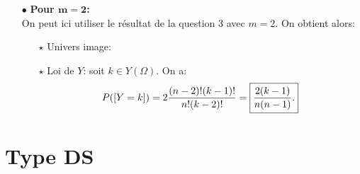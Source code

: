\documentclass[a4paper, 11pt,reqno]{article}
\begin{document}
\begin{correction}
\begin{enumerate}
\begin{itemize}
\begin{itemize}
						      $$P(\lbrack Y=k\rbrack)=P(N_1)P_{N_1}(N_2)P_{N_1\cap N_2}(N_3)\dots P_{N_1\cap N_2\cap \dots\cap N_{k-2}}(N_{k-1})P_{N_1\cap N_2\cap \dots\cap N_{k-1}}(B_k).$$
						      De plus $P(N_1)=\ddp\frac{n-1}{n}\not= 0$ et ainsi la probabilit\'e conditionnelle $P_{N_1}$ existe bien. Puis d'apr\`{e}s la formule des probabilit\'es compos\'ees, on a: $P(N_1\cap N_2)=P(N_1)P_{N_1}(N_2)=\ddp\frac{n-1}{n}\times \ddp\frac{n-2}{n-1}=\ddp\frac{n-2}{n}\not= 0$ et ainsi la probabilit\'e conditionnelle $P_{N_1\cap N_2}$ existe bien. En it\'erant le raisonnement on peut alors montrer que toutes les probabilit\'es conditionnelles existent bien. On obtient alors:
						      $$P(\lbrack Y=k\rbrack)=\ddp\frac{n-1}{n}\times \ddp\frac{n-2}{n-1}\ddp\frac{n-3}{n-2}\dots\ddp\frac{n-k+1}{n-k+2}\ddp\frac{1}{n-k+1}=\ddp\frac{1}{n}.$$
						      Ainsi on reconna\^{i}t une loi uniforme: 
				      \end{itemize}
			      \item[$\bullet$] \textbf{Pour $\mathbf{m=2}$:}\\
				      \noindent On peut ici utiliser le r\'esultat de la question 3 avec $m=2$. On obtient alors:
				      \begin{itemize}
					      \item[$\star$] Univers image: 
					      \item[$\star$] Loi de $Y$: soit $k\in Y(\Omega)$. On a:
						      $$P(\lbrack Y=k\rbrack)=2\displaystyle\frac{(n-2)!(k-1)!}{n!(k-2)!}=\fbox{$\displaystyle\frac{2(k-1)}{n(n-1)}.$}$$
				      \end{itemize}
		      \end{itemize}
	\end{enumerate}
\end{correction}
\section*{Type DS}
\end{document}

